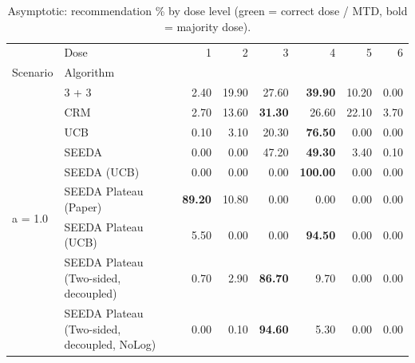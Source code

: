 \begin{table}[H]
\centering
\caption{Asymptotic: recommendation \% by dose level (green = correct dose / MTD, bold = majority dose).}
\label{tab:asym_rec_by_dose}
\begin{tabular}{llrrrrrr}
\toprule
 & Dose & 1 & 2 & 3 & 4 & 5 & 6 \\
Scenario & Algorithm &  &  &  &  &  &  \\
\midrule
\multirow[c]{9}{*}{a = 1.0} & 3 + 3 & 2.40 & 19.90 & {\cellcolor[HTML]{C8E6C9}} 27.60 & \bfseries 39.90 & 10.20 & 0.00 \\
 & CRM & 2.70 & 13.60 & {\cellcolor[HTML]{C8E6C9}} \bfseries 31.30 & 26.60 & 22.10 & 3.70 \\
 & UCB & 0.10 & 3.10 & {\cellcolor[HTML]{C8E6C9}} 20.30 & \bfseries 76.50 & 0.00 & 0.00 \\
 & SEEDA & 0.00 & 0.00 & {\cellcolor[HTML]{C8E6C9}} 47.20 & \bfseries 49.30 & 3.40 & 0.10 \\
 & SEEDA (UCB) & 0.00 & 0.00 & {\cellcolor[HTML]{C8E6C9}} 0.00 & \bfseries 100.00 & 0.00 & 0.00 \\
 & SEEDA Plateau (Paper) & \bfseries 89.20 & 10.80 & {\cellcolor[HTML]{C8E6C9}} 0.00 & 0.00 & 0.00 & 0.00 \\
 & SEEDA Plateau (UCB) & 5.50 & 0.00 & {\cellcolor[HTML]{C8E6C9}} 0.00 & \bfseries 94.50 & 0.00 & 0.00 \\
 & SEEDA Plateau (Two-sided, decoupled) & 0.70 & 2.90 & {\cellcolor[HTML]{C8E6C9}} \bfseries 86.70 & 9.70 & 0.00 & 0.00 \\
 & SEEDA Plateau (Two-sided, decoupled, NoLog) & 0.00 & 0.10 & {\cellcolor[HTML]{C8E6C9}} \bfseries 94.60 & 5.30 & 0.00 & 0.00 \\
\bottomrule
\end{tabular}
\end{table}
